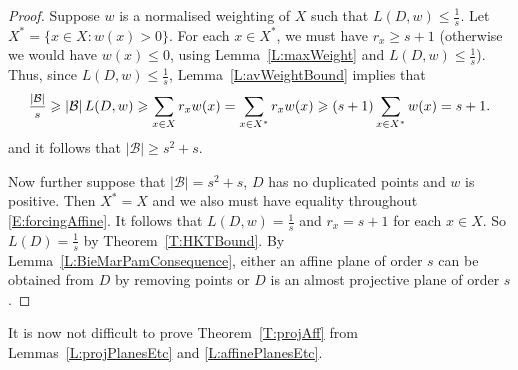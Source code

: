 \documentclass[11pt]{article}
\theoremstyle{definition}
\renewcommand{\leq}{\leqslant}
\renewcommand{\geq}{\geqslant}
\newcommand{\B}{{\ensuremath{\mathcal{B}}}}
\begin{document}
\begin{proof}
Suppose $w$ is a normalised weighting of $X$ such that $L(D,w) \leq \frac{1}{s}$. Let $X^*={\{x \in X:w(x)>0\}}$. For each $x \in X^*$, we must have $r_x \geq s+1$ (otherwise we would have $w(x) \leq 0$, using Lemma~\ref{L:maxWeight} and $L(D,w) \leq \frac{1}{s}$). Thus, since $L(D,w) \leq \frac{1}{s}$, Lemma~\ref{L:avWeightBound} implies that
\begin{equation}\label{E:forcingAffine}
\mfrac{|\B|}{s} \geq |\B|\,L(D,w) \geq \sum_{x \in X}r_xw(x)=\sum_{x \in X^*}r_xw(x) \geq (s+1)\sum_{x \in X^*}w(x)=s+1.
\end{equation}
and it follows that $|\B| \geq s^2+s$.

Now further suppose that $|\B|=s^2+s$, $D$ has no duplicated points and $w$ is positive. Then $X^*=X$ and we also must have equality throughout \eqref{E:forcingAffine}. It follows that $L(D,w)=\frac{1}{s}$ and $r_x = s+1$ for each $x \in X$. So $L(D)=\frac{1}{s}$ by Theorem~\ref{T:HKTBound}. By Lemma~\ref{L:BieMarPamConsequence}, either an affine plane of order $s$ can be obtained from $D$ by removing points or $D$ is an almost projective plane of order $s$.
\end{proof}

It is now not difficult to prove Theorem~\ref{T:projAff} from Lemmas~\ref{L:projPlanesEtc} and \ref{L:affinePlanesEtc}.
\end{document}
